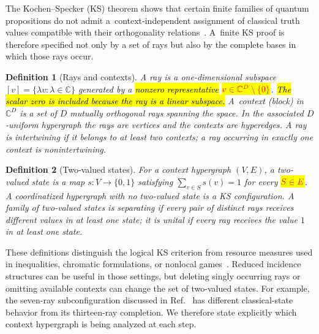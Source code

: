 \documentclass[%
  reprint,
  superscriptaddress,
  showpacs,
  showkeys,
  amsmath,amssymb,
  pra,
  longbibliography,
  floatfix,
  x11names
]{revtex4-2}
\newenvironment{revision}{\begingroup}{\endgroup}
\newcommand{\corr}[1]{{\color{red}\hl{#1}}}
\newcommand{\corrmath}[1]{\begingroup\setlength{\fboxsep}{1pt}\colorbox{yellow}{\ensuremath{\color{red}#1}}\endgroup}
\newtheorem{definition}{Definition}
\begin{document}
\begin{revision}
The Kochen--Specker (KS) theorem shows that certain finite families of quantum propositions do not admit a~context-independent assignment of classical truth values compatible with their orthogonality relations~\cite{kochen1}.  A~finite KS proof is therefore specified not only by a set of rays but also by the complete bases in which those rays occur.

\begin{definition}[Rays and contexts]
\label{def:contexts}
A \emph{ray} is a one-dimensional subspace
$[v]=\{\lambda v:\lambda\in\mathbb{C}\}$ generated by a
\corr{nonzero representative} \corrmath{v\in\mathbb{C}^D\setminus\{0\}}.
\corr{The scalar zero is included because the ray is a linear subspace.}
A~\emph{context} (block) in $\mathbb{C}^D$ is a set of $D$ mutually orthogonal rays spanning the space.  In the associated $D$-uniform hypergraph the rays are vertices and the contexts are hyperedges.  A ray is \emph{intertwining} if it belongs to at least two contexts; a ray occurring in exactly one context is nonintertwining.
\end{definition}

\begin{definition}[Two-valued states]
\label{def:states}
For a context hypergraph $(V,E)$, a two-valued state is a map $s:V\to\{0,1\}$ satisfying $\sum_{v\in S}s(v)=1$ for every \corrmath{S\in E}.
A coordinatized hypergraph with no two-valued state is a KS configuration.  A family of two-valued states is \emph{separating} if every pair of distinct rays receives different values in at least one state; it is \emph{unital} if every ray receives the value $1$ in at least one state.
\end{definition}

These definitions distinguish the logical KS criterion from resource measures used in inequalities, chromatic formulations, or nonlocal games~\cite{cabello:210401,2024-cabello-trandafir0,svozil-2025-color}.  Reduced incidence structures can be useful in those settings, but deleting singly occurring rays or omitting available contexts can change the set of two-valued states.  For example, the seven-ray subconfiguration discussed in Ref.~\cite[Fig.~6(a)]{pavicic-2025} has different classical-state behavior from its thirteen-ray completion.  We therefore state explicitly which context hypergraph is being analyzed at each step.


\end{revision}
\end{document}
